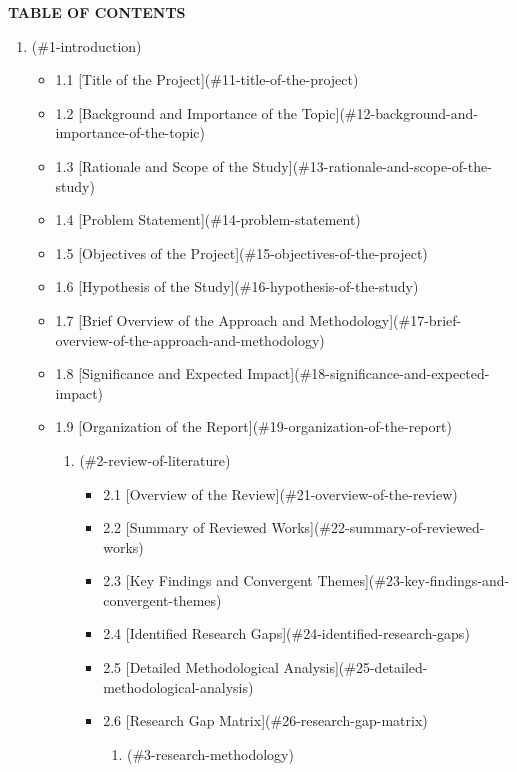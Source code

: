 \documentclass[12pt, a4paper]{report}
\begin{document}
\begin{center}
{\fontsize{14}{17}\bfseries TABLE OF CONTENTS}\\
\end{center}
\begin{enumerate}[leftmargin=*]
  \item [Introduction](\#1-introduction)
\begin{itemize}[leftmargin=*]
  \item 1.1 [Title of the Project](\#11-title-of-the-project)
  \item 1.2 [Background and Importance of the Topic](\#12-background-and-importance-of-the-topic)
  \item 1.3 [Rationale and Scope of the Study](\#13-rationale-and-scope-of-the-study)
  \item 1.4 [Problem Statement](\#14-problem-statement)
  \item 1.5 [Objectives of the Project](\#15-objectives-of-the-project)
  \item 1.6 [Hypothesis of the Study](\#16-hypothesis-of-the-study)
  \item 1.7 [Brief Overview of the Approach and Methodology](\#17-brief-overview-of-the-approach-and-methodology)
  \item 1.8 [Significance and Expected Impact](\#18-significance-and-expected-impact)
  \item 1.9 [Organization of the Report](\#19-organization-of-the-report)
\begin{enumerate}[leftmargin=*]
  \item [Review of Literature](\#2-review-of-literature)
\begin{itemize}[leftmargin=*]
  \item 2.1 [Overview of the Review](\#21-overview-of-the-review)
  \item 2.2 [Summary of Reviewed Works](\#22-summary-of-reviewed-works)
  \item 2.3 [Key Findings and Convergent Themes](\#23-key-findings-and-convergent-themes)
  \item 2.4 [Identified Research Gaps](\#24-identified-research-gaps)
  \item 2.5 [Detailed Methodological Analysis](\#25-detailed-methodological-analysis)
  \item 2.6 [Research Gap Matrix](\#26-research-gap-matrix)
\begin{enumerate}[leftmargin=*]
  \item [Research Methodology](\#3-research-methodology)
\begin{itemize}[leftmargin=*]

\end{itemize}
\end{enumerate}
\end{itemize}
\end{enumerate}
\end{itemize}
\end{enumerate}
\end{document}
